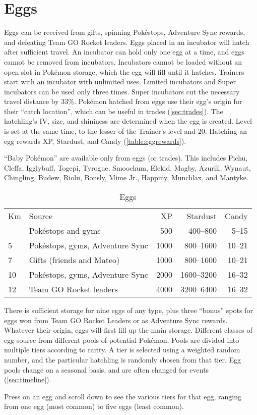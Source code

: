 \section{Eggs\label{sec:eggs}}
Eggs can be received from gifts, spinning Pokéstops, Adventure Sync rewards,
  and defeating Team GO Rocket leaders.
Eggs placed in an incubator will hatch after sufficient travel.
An incubator can hold only one egg at a time, and eggs cannot be removed from incubators.
Incubators cannot be loaded without an open slot in Pokémon storage, which the egg will fill
 until it hatches.
Trainers start with an incubator with unlimited uses.
Limited incubators and Super incubators can be used only three times.
Super incubators cut the necessary travel distance by 33\%.
Pokémon hatched from eggs use their egg's origin for their ``catch location'',
 which can be useful in trades (\autoref{sec:trades}).
The hatchling's IV, size, and shininess are determined when the egg is created.
Level is set at the same time, to the lesser of the Trainer's level and 20.
Hatching an egg rewards XP, Stardust, and Candy (\autoref{table:eggrewards}).
\begin{tipbox}[title=Baby Pokémon]
``Baby Pokémon'' are available only from eggs (or trades).
This includes Pichu, Cleffa, Igglybuff, Togepi, Tyrogue, Smoochum, Elekid, Magby,
 Azurill, Wynaut, Chingling, Budew, Riolu, Bonsly, Mime Jr., Happiny, Munchlax, and Mantyke.
\end{tipbox}
\begin{table}
\centering
\begin{tabular}{llrrr}
Km & Source & XP & Stardust & Candy\\
\Midrule
  2 & Pokéstops and gyms & 500 & 400--800 & 5--15\\
  5 & Pokéstops, gyms, Adventure Sync & 1000 & 800--1600 & 10--21\\
  7 & Gifts (friends and Mateo) & 1000 & 800--1600 & 10--21\\
  10 & Pokéstops, gyms, Adventure Sync & 2000 & 1600--3200 & 16--32\\
  12 & Team GO Rocket leaders & 4000 & 3200--6400 & 16--32\\
\end{tabular}
\caption{Eggs\label{table:eggrewards}}
\end{table}
There is sufficient storage for nine eggs of any type, plus three ``bonus''
 spots for eggs won from Team GO Rocket Leaders or as Adventure Sync rewards.
Whatever their origin, eggs will first fill up the main storage.
Different classes of egg source from different pools of potential Pokémon.
Pools are divided into multiple tiers according to rarity.
A tier is selected using a weighted random number, and the particular hatchling
 is randomly chosen from that tier.
Egg pools change on a seasonal basis, and are often changed for events (\autoref{sec:timeline}).
\begin{tipbox}[title=Seeing the egg pool]
Press on an egg and scroll down to see the various tiers for that egg, ranging
  from one egg (most common) to five eggs (least common).
\end{tipbox}

